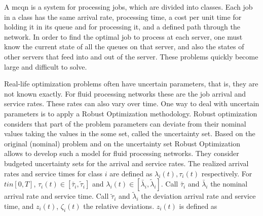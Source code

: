 \documentclass[11pt,a4paper,titlepage]{article}
\theoremstyle{definition}
\theoremstyle{plain}
\begin{document}
A \gls{mcqn} is a system for processing jobs,
which are divided into classes.
Each job in a class has the same arrival rate,
processing time,
a cost per unit time for holding it in its queue and for processing it,
and a defined path through the network.
In order to find the optimal job to process at each server,
one must know the current state of all the queues on that server,
and also the states of other servers that feed into and out of the server.
These problems quickly become large and difficult to solve.

%
%

Real-life optimization problems often have uncertain parameters,
that is, they are not known exactly.
For fluid processing networks these are the job arrival and service rates.
These rates can also vary over time.
One way to deal with uncertain parameters is to apply a Robust Optimization methodology.
Robust optimization considers that part of the problem parameters can deviate from their nominal values taking the values in the some set,
called the uncertainty set.
Based on the original (nominal) problem and on the uncertainty set Robust Optimization allows
\Autocite{bertsimas2014robust} to develop such a model for
fluid processing networks.
They consider budgeted uncertainty sets for the arrival and service rates.
The realized arrival rates and service times for class $i$ are
defined as $\lambda_i(t), \tau_i(t)$ respectively.
For $t in [0,T]$,
$\tau_i(t) \in [\bar{\tau}_i, \tilde{\tau}_i]$ and
$\lambda_i(t) \in [\bar{\lambda}_i, \tilde{\lambda}_i]$.
Call $\bar{\tau}_i$ and $\bar{\lambda}_i$ the nominal arrival rate and service time.
Call $\tilde{\tau}_i$ and $\tilde{\lambda}_i$ the deviation arrival rate and service time,
and $z_i(t)$, $\zeta_i(t)$ the relative deviations.
$z_i(t)$ is defined as
\end{document}
